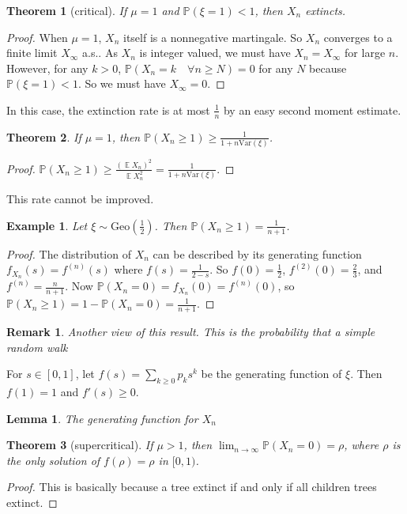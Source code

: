 \documentclass{article}
\newtheorem{Thm}{Theorem}[section]
\newtheorem{Lem}{Lemma}[section]
\newtheorem{Eg}{Example}[section]
\newtheorem*{Rk}{Remark}
\theoremstyle{definition}
\newcommand{\EE}{\operatorname{\mathbb{E}}}
\newcommand{\PP}{\mathbb{P}}
\renewcommand{\geq}{\geqslant}
\newcommand{\<}{\left\langle}
\renewcommand{\>}{\right\rangle}
\newcommand{\var}{\text{Var}}
\begin{document}
\begin{Thm}[critical]
    If $\mu=1$ and $\PP(\xi=1)<1$, then $X_n$ extincts.
\end{Thm}
\begin{proof}
    When $\mu=1$, $X_n$ itself is a nonnegative martingale. So $X_n$ converges to a finite limit $X_\infty$ a.s..
    As $X_n$ is integer valued, we must have $X_n= X_\infty$ for large $n$. 
    However, for any $k>0$, $\PP(X_n=k\quad \forall n\geq N)=0$ for any $N$ because $\PP(\xi=1)<1$. So we must have $X_\infty=0$.
\end{proof}
In this case, the extinction rate is at most $\frac{1}{n}$ by an easy second moment estimate.
\begin{Thm}
    If $\mu=1$, then $\PP(X_n \geq 1)\geq\frac{1}{1+n\var(\xi)}$.
\end{Thm}
\begin{proof}
    $\PP(X_n \geq 1)\geq\frac{(\EE X_n)^2}{\EE X_n^2}=\frac{1}{1+n\var(\xi)}$.
\end{proof}
This rate cannot be improved.
\begin{Eg}
    Let $\xi\sim\text{Geo}(\frac{1}{2})$. Then $\PP(X_n \geq 1)=\frac{1}{n+1}$.
\end{Eg}
\begin{proof}
    The distribution of $X_n$ can be described by its generating function $f_{X_n}(s)=f^{(n)}(s)$
    where $f(s)=\frac{1}{2-s}$. So $f(0)=\frac{1}{2}$, $f^{(2)}(0)=\frac{2}{3}$, and $f^{(n)}=\frac{n}{n+1}$.
    Now $\PP(X_n=0)=f_{X_n}(0)=f^{(n)}(0)$, so $\PP(X_n \geq 1)=1-\PP(X_n = 0)=\frac{1}{n+1}$.
\end{proof}
\begin{Rk}
    Another view of this result.
    This is the probability that a simple random walk 
\end{Rk}
For $s\in [0,1]$, let $f(s)=\sum_{k\geq 0}p_ks^k$ be the generating function of $\xi$.
Then $f(1)=1$ and $f'(s)\geq 0$.
\begin{Lem}
    The generating function for $X_n$
\end{Lem}


\begin{Thm}[supercritical]
    If $\mu>1$, then $\lim_{n\to\infty}\PP(X_n=0)=\rho$, where $\rho$ is the only solution of $f(\rho)=\rho$ in $[0,1)$.
\end{Thm}
\begin{proof}
    This is basically because a tree extinct if and only if all children trees extinct.
\end{proof}
\end{document}
